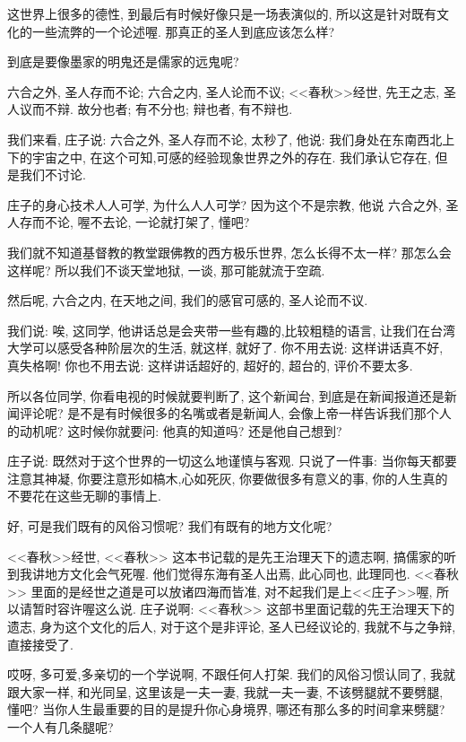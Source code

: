 \documentclass[11pt]{article}
\begin{document}
这世界上很多的德性, 到最后有时候好像只是一场表演似的, 所以这是针对既有文化的一些流弊的一个论述喔. 那真正的圣人到底应该怎么样? 

到底是要像墨家的明鬼还是儒家的远鬼呢? 

\begin{center}
	{\color{magenta} 六合之外, 圣人存而不论; 六合之内, 圣人论而不议; <<春秋>>经世, 先王之志, 圣人议而不辩. 故分也者; 有不分也; 辩也者, 有不辩也.}
\end{center}

\vspace{-0.5cm}

我们来看, 庄子说: {\color{blue} 六合之外, 圣人存而不论}, 太秒了, 他说: 我们身处在东南西北上下的宇宙之中, 在这个可知,可感的经验现象世界之外的存在. 我们承认它存在, 但是我们不讨论.

庄子的身心技术人人可学, 为什么人人可学? 因为这个不是宗教, 他说{\color{blue} 六合之外, 圣人存而不论,} 喔不去论, 一论就打架了, 懂吧? 

我们就不知道基督教的教堂跟佛教的西方极乐世界, 怎么长得不太一样? 那怎么会这样呢? 所以我们不谈天堂地狱, 一谈, 那可能就流于空疏.

然后呢, {\color{blue} 六合之内}, 在天地之间, 我们的感官可感的, {\color{blue} 圣人论而不议}.

我们说: 唉, 这同学, 他讲话总是会夹带一些有趣的,比较粗糙的语言, 让我们在台湾大学可以感受各种阶层次的生活, 就这样, 就好了. 你不用去说: 这样讲话真不好, 真失格啊! 你也不用去说: 这样讲话超好的, 超好的, 超台的, 评价不要太多. 

所以各位同学, 你看电视的时候就要判断了, 这个新闻台, 到底是在新闻报道还是新闻评论呢? 是不是有时候很多的名嘴或者是新闻人, 会像上帝一样告诉我们那个人的动机呢? 这时候你就要问: 他真的知道吗? 还是他自己想到? 

庄子说: 既然对于这个世界的一切这么地谨慎与客观. 只说了一件事: 当你每天都要注意其神凝, 你要注意形如槁木,心如死灰, 你要做很多有意义的事, 你的人生真的不要花在这些无聊的事情上.

好, 可是我们既有的风俗习惯呢? 我们有既有的地方文化呢?

{\color{blue} <<春秋>>经世}, <<春秋>> 这本书记载的是先王治理天下的遗志啊, 搞儒家的听到我讲地方文化会气死喔. 他们觉得东海有圣人出焉, 此心同也, 此理同也. <<春秋>> 里面的是经世之道是可以放诸四海而皆准, 对不起我们是上<<庄子>>喔, 所以请暂时容许喔这么说. 庄子说啊: <<春秋>> 这部书里面记载的先王治理天下的遗志, 身为这个文化的后人, 对于这个是非评论, 圣人已经议论的, 我就不与之争辩, 直接接受了. 

哎呀, 多可爱,多亲切的一个学说啊, 不跟任何人打架. 我们的风俗习惯认同了, 我就跟大家一样, 和光同呈, 这里该是一夫一妻, 我就一夫一妻, 不该劈腿就不要劈腿, 懂吧? 当你人生最重要的目的是提升你心身境界, 哪还有那么多的时间拿来劈腿? 一个人有几条腿呢?
\end{document}
